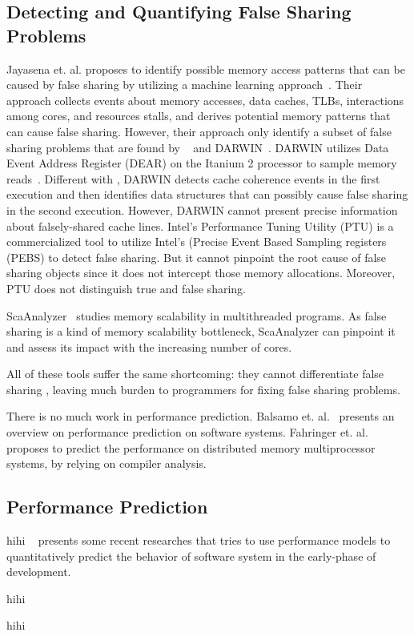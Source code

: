 \subsection{Detecting and Quantifying False Sharing Problems}
Jayasena et. al. proposes to identify possible memory access patterns that can be caused by false sharing by utilizing a machine learning approach~\cite{mldetect}. Their approach collects events about memory accesses, data caches, TLBs, interactions among cores, and resources stalls, and derives potential memory patterns that can cause false sharing. However, their approach only identify a subset of false sharing problems that are found by \Predator{}~\cite{Predator} and DARWIN~\cite{openmp}. DARWIN utilizes Data Event Address Register (DEAR) on the Itanium 2 processor to sample memory reads~\cite{Wicaksono11detectingfalse, openmp}. Different with \Cheetah{}, DARWIN detects cache coherence events in the first execution and then identifies data structures that can possibly cause false sharing in the second execution.  However, DARWIN cannot present precise information about falsely-shared cache lines. Intel's Performance Tuning Utility (PTU) is a commercialized tool to utilize Intel's (Precise Event Based Sampling registers (PEBS) to detect false sharing. But it cannot pinpoint the root cause of false sharing objects since it does not intercept those memory allocations. Moreover, PTU does not distinguish true and false sharing. 

ScaAnalyzer~\cite{} studies memory scalability in multithreaded programs. As false sharing is a kind of memory scalability bottleneck, ScaAnalyzer can pinpoint it and assess its impact with the increasing number of cores. 

All of these tools suffer the same shortcoming: they cannot differentiate false sharing , leaving much burden to programmers for fixing false sharing problems. 

There is no much work in performance prediction. Balsamo et. al.~\cite{Balsamo:2004:MPP:987527.987640} presents an overview on performance prediction on software systems. 
Fahringer et. al. proposes to predict the performance on distributed memory multiprocessor systems, by relying on compiler analysis. 

\subsection{Performance Prediction}

hihi ~\cite{Balsamo:2004:MPP:987527.987640} presents some recent researches that tries to use performance models to quantitatively predict the behavior of software system in the early-phase of development. 

hihi ~\cite{impactofsharing}

hihi~\cite{Joao:2012:BIS:2150976.2151001} 


